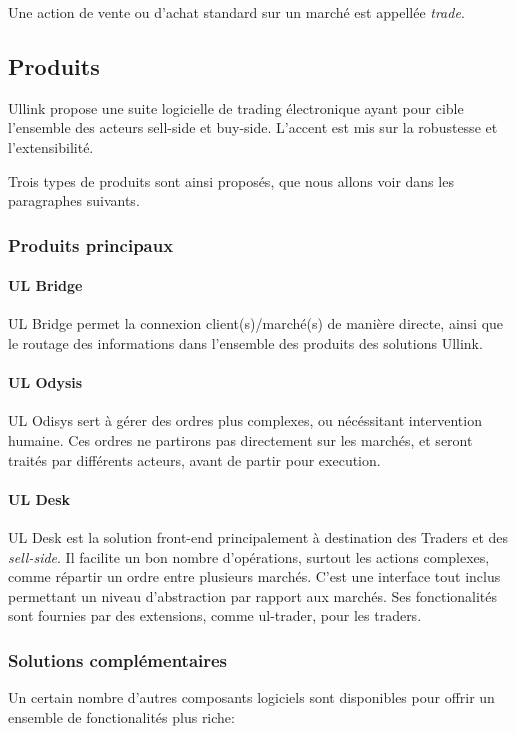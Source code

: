 \documentclass[a4paper, 12pt]{article}
\begin{document}
Une action de vente ou d'achat standard sur un marché est appellée \emph{trade}.

\subsection{Produits}

Ullink propose une suite logicielle de trading électronique ayant pour cible l'ensemble des acteurs sell-side et buy-side. L'accent est mis sur la robustesse et l'extensibilité.

Trois types de produits sont ainsi proposés, que nous allons voir dans les paragraphes suivants.

\subsubsection{Produits principaux}

\paragraph{UL Bridge}

UL Bridge permet la connexion client(s)/marché(s) de manière directe, ainsi que le routage des informations dans l'ensemble des produits des solutions Ullink.

\paragraph{UL Odysis}

UL Odisys sert à gérer des ordres plus complexes, ou nécéssitant intervention humaine. Ces ordres ne partirons pas directement sur les marchés, et seront traités par différents acteurs, avant de partir pour execution.

\paragraph{UL Desk}
UL Desk est la solution front-end principalement à destination des Traders et des \emph{sell-side}. Il facilite un bon nombre d'opérations, surtout les actions complexes, comme répartir un ordre entre plusieurs marchés. C'est une interface tout inclus permettant un niveau d'abstraction par rapport aux marchés. Ses fonctionalités sont fournies par des extensions, comme ul-trader, pour les traders.

\subsubsection{Solutions complémentaires}
Un certain nombre d'autres composants logiciels sont disponibles pour offrir un ensemble de fonctionalités plus riche:
\end{document}
